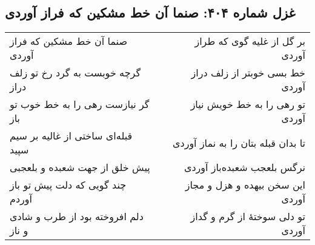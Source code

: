 \begin{center}
\section*{غزل شماره ۴۰۴: صنما آن خط مشکین که فراز آوردی}
\label{sec:404}
\begin{longtable}{l p{0.5cm} r}
صنما آن خط مشکین که فراز آوردی
&&
بر گل از غلیه گوی که طراز آوردی
\\
گرچه خوبست به گرد رخ تو زلف دراز
&&
خط بسی خوبتر از زلف دراز آوردی
\\
گر نیازست رهی را به خط خوب تو باز
&&
تو رهی را به خط خویش نیاز آوردی
\\
قبله‌ای ساختی از غالیه بر سیم سپید
&&
تا بدان قبله بتان را به نماز آوردی
\\
پیش خلق از جهت شعبده و بلعجبی
&&
نرگس بلعجب شعبده‌باز آوردی
\\
چند گویی که دلت پیش تو باز آوردم
&&
این سخن بیهده و هزل و مجاز آوردی
\\
دلم افروخته بود از طرب و شادی و ناز
&&
تو دلی سوختهٔ از گرم و گداز آوردی
\\
\end{longtable}
\end{center}
